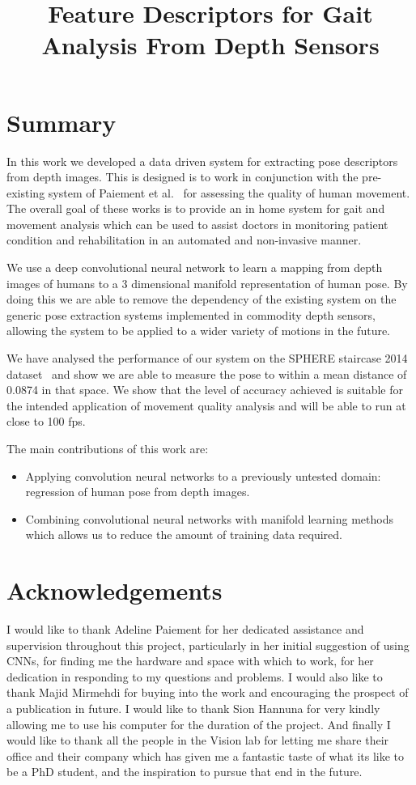 \documentclass[11pt]{article} %
\title{%
Feature Descriptors for Gait Analysis From Depth Sensors}
\begin{document}



\section{Summary}

In this work we developed a data driven system for extracting pose descriptors from depth images. This is designed is to work in conjunction with the pre-existing system of Paiement et al.~\cite{Paiement} for assessing the quality of human movement. The overall goal of these works is to provide an in home system for gait and movement analysis which can be used to assist doctors in monitoring patient condition and rehabilitation in an automated and non-invasive manner. 

We use a deep convolutional neural network to learn a mapping from depth images of humans to a 3 dimensional manifold representation of human pose. By doing this we are able to remove the dependency of the existing system on the generic pose extraction systems implemented in commodity depth sensors, allowing the system to be applied to a wider variety of motions in the future.

We have analysed the performance of our system on the SPHERE staircase 2014 dataset~\cite{Paiement} and show we are able to measure the pose to within a mean distance of 0.0874 in that space. We show that the level of accuracy achieved is suitable for the intended application of movement quality analysis and will be able to run at close to 100 fps.


The main contributions of this work are:
\begin{itemize}
\item{Applying convolution neural networks to a previously untested domain: regression of human pose from depth images.}
\item{Combining convolutional neural networks with manifold learning methods which allows us to reduce the amount of training data required.}
\end{itemize}

\newpage

\section{Acknowledgements}
I would like to thank Adeline Paiement for her dedicated assistance and supervision throughout this project, particularly in her initial suggestion of using CNNs, for finding me the hardware and space with which to work, for her dedication in responding to my questions and problems. I would also like to thank Majid Mirmehdi for buying into the work and encouraging the prospect of a publication in future. I would like to thank Sion Hannuna for very kindly allowing me to use his computer for the duration of the project. And finally I would like to thank all the people in the Vision lab for letting me share their office and their company which has given me a fantastic taste of what its like to be a PhD student, and the inspiration to pursue that end in the future.
\end{document}
